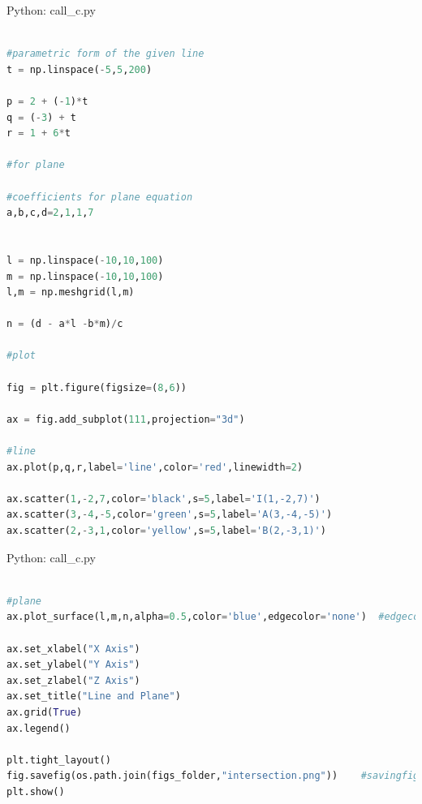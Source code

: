 \documentclass{beamer}
\numberwithin{equation}{section}
\theoremstyle{remark}
\begin{document}
\begin{frame}[fragile]{Python: call\_c.py}
\begin{lstlisting}[language=Python]

#parametric form of the given line
t = np.linspace(-5,5,200)

p = 2 + (-1)*t
q = (-3) + t
r = 1 + 6*t

#for plane

#coefficients for plane equation
a,b,c,d=2,1,1,7


l = np.linspace(-10,10,100)
m = np.linspace(-10,10,100)
l,m = np.meshgrid(l,m)

n = (d - a*l -b*m)/c

#plot

fig = plt.figure(figsize=(8,6))

ax = fig.add_subplot(111,projection="3d")

#line 
ax.plot(p,q,r,label='line',color='red',linewidth=2)

ax.scatter(1,-2,7,color='black',s=5,label='I(1,-2,7)')
ax.scatter(3,-4,-5,color='green',s=5,label='A(3,-4,-5)')
ax.scatter(2,-3,1,color='yellow',s=5,label='B(2,-3,1)')

\end{lstlisting}
\end{frame}

\begin{frame}[fragile]{Python: call\_c.py}
\begin{lstlisting}[language=Python]

#plane 
ax.plot_surface(l,m,n,alpha=0.5,color='blue',edgecolor='none')  #edgecolor='none' means edges are not drawn for the mesh and hence surface appears smooth without grid lines.

ax.set_xlabel("X Axis")
ax.set_ylabel("Y Axis")
ax.set_zlabel("Z Axis")
ax.set_title("Line and Plane")
ax.grid(True)
ax.legend()

plt.tight_layout()
fig.savefig(os.path.join(figs_folder,"intersection.png"))    #savingfig using figure object
plt.show()

\end{lstlisting}
\end{frame}
\end{document}
